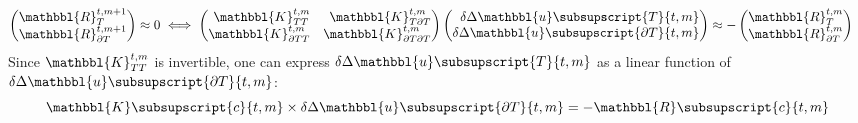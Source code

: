         \begin{equation}
            \begin{aligned}
                \begin{pmatrix}
                    \begin{aligned}
                        \mathbbl{R}_{T}^{t,m+1}
                        \\
                        \mathbbl{R}_{\partial T}^{t,m+1}
                    \end{aligned}
                \end{pmatrix}
                \approx
                0
                & \iff
                \begin{pmatrix}
                    \begin{aligned}
                        \mathbbl{K}_{T T}^{t,m} && \mathbbl{K}_{T \partial T}^{t,m}
                        \\
                        \mathbbl{K}_{\partial T T}^{t,m} && \mathbbl{K}_{\partial T \partial T}^{t,m}
                    \end{aligned}
                \end{pmatrix}
                \begin{pmatrix}
                    \begin{aligned}
                        \delta \Delta \mathbbl{u}\subsupscript{{T}}{t,m}
                        \\
                        \delta \Delta \mathbbl{u}\subsupscript{{\partial T}}{t,m}
                    \end{aligned}
                \end{pmatrix}
                \approx
                -
                \begin{pmatrix}
                    \begin{aligned}
                        \mathbbl{R}_{T}^{t,m}
                        \\
                        \mathbbl{R}_{\partial T}^{t,m}
                    \end{aligned}
                \end{pmatrix}
            \end{aligned}
        \end{equation}
        Since $\mathbbl{K}_{T T}^{t,m}$ is invertible, one can express $\delta \Delta \mathbbl{u}\subsupscript{{T}}{t,m}$ as a linear function of $\delta \Delta \mathbbl{u}\subsupscript{{\partial T}}{t,m}$:
        \begin{equation}
            {\mathbbl{K}}\subsupscript{c}{t,m}
            \times
            \delta \Delta {\mathbbl{u}}\subsupscript{{\partial T}}{t,m}
            =
            - {\mathbbl{R}}\subsupscript{c}{t,m}
        \end{equation}
